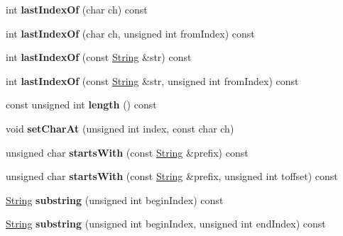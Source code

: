 \begin{DoxyCompactItemize}
\item 
\hypertarget{classString_ae3dbedf8dc518d947c91f484b6d78a6f}{
int {\bfseries last\-Index\-Of} (char ch) const }
\label{classString_ae3dbedf8dc518d947c91f484b6d78a6f}

\item 
\hypertarget{classString_a2d7b15343faa3c6048ff621e925fa156}{
int {\bfseries last\-Index\-Of} (char ch, unsigned int from\-Index) const }
\label{classString_a2d7b15343faa3c6048ff621e925fa156}

\item 
\hypertarget{classString_a1fc027b0c1160e9e9e9460f68021f0bd}{
int {\bfseries last\-Index\-Of} (const \hyperlink{classString}{\-String} \&str) const }
\label{classString_a1fc027b0c1160e9e9e9460f68021f0bd}

\item 
\hypertarget{classString_a5f060c3fb78317d673b4eea9d3f33aef}{
int {\bfseries last\-Index\-Of} (const \hyperlink{classString}{\-String} \&str, unsigned int from\-Index) const }
\label{classString_a5f060c3fb78317d673b4eea9d3f33aef}

\item 
\hypertarget{classString_a61d8c8330af43b5f6ccbf11a92457b44}{
const unsigned int {\bfseries length} () const }
\label{classString_a61d8c8330af43b5f6ccbf11a92457b44}

\item 
\hypertarget{classString_a5f276a61766d25a1c03e74905261ad99}{
void {\bfseries set\-Char\-At} (unsigned int index, const char ch)}
\label{classString_a5f276a61766d25a1c03e74905261ad99}

\item 
\hypertarget{classString_a151339707b7370176a46b9edef5c3bdc}{
unsigned char {\bfseries starts\-With} (const \hyperlink{classString}{\-String} \&prefix) const }
\label{classString_a151339707b7370176a46b9edef5c3bdc}

\item 
\hypertarget{classString_a4e085c4865b752cb236ffb23918094e5}{
unsigned char {\bfseries starts\-With} (const \hyperlink{classString}{\-String} \&prefix, unsigned int toffset) const }
\label{classString_a4e085c4865b752cb236ffb23918094e5}

\item 
\hypertarget{classString_ad27c108b34b07c6785e194c2d968bb1c}{
\hyperlink{classString}{\-String} {\bfseries substring} (unsigned int begin\-Index) const }
\label{classString_ad27c108b34b07c6785e194c2d968bb1c}

\item 
\hypertarget{classString_aea448757a5dbe286cb522e1b02682d89}{
\hyperlink{classString}{\-String} {\bfseries substring} (unsigned int begin\-Index, unsigned int end\-Index) const }
\label{classString_aea448757a5dbe286cb522e1b02682d89}


\end{DoxyCompactItemize}
